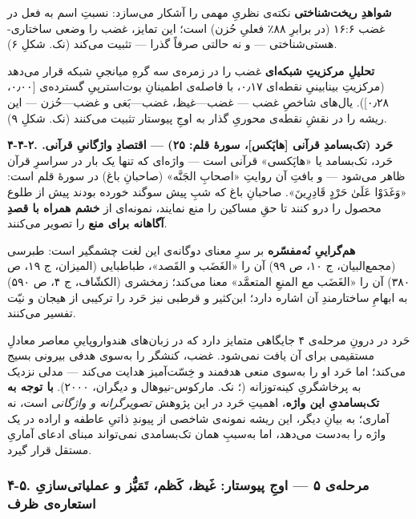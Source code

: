 \documentclass[12pt,a4paper]{article}
\begin{document}
\begin{RTL}
\begin{otherlanguage}{persian}
\textbf{شواهدِ ریخت‌شناختی} نکته‌ی نظریِ مهمی را آشکار می‌سازد: نسبتِ اسم به
فعل در غضب ۱۶:۶ (در برابرِ ۸۸٪ فعلیِ حُزن) است؛ این تمایز، غضب را وضعی
ساختاری-هستی‌شناختی --- و نه حالتی صرفاً گذرا --- تثبیت می‌کند (نک. شکلِ ۶).

\textbf{تحلیلِ مرکزیتِ شبکه‌ای} غضب را در زمره‌ی سه گرهِ میانجیِ شبکه قرار
می‌دهد (مرکزیتِ بینابینیِ نقطه‌ای ۰٫۱۷، با فاصله‌ی اطمینانِ بوت‌استرپیِ گسترده‌ی
{[}۰٫۰۰، ۰٫۲۸{]}). یال‌های شاخصِ غضب --- غضب---غیظ، غضب---بَغی و غضب---حُزن
--- این ریشه را در نقشِ نقطه‌ی محوریِ گذار به اوجِ پیوستار تثبیت می‌کنند (نک.
شکلِ ۹).

\textbf{۴-۴-۲. حَرد (تک‌بسامدِ قرآنی {[}هاپَکس{]}، سورۀ قلم: ۲۵) --- اقتصادِ
واژگانیِ قرآنی.} حَرد، تک‌بسامد یا «هاپَکسی» قرآنی است --- واژه‌ای که تنها یک
بار در سراسرِ قرآن ظاهر می‌شود --- و بافتِ آن روایتِ «اصحابِ الجَنَّه» (صاحبانِ
باغ) در سورۀ قلم است: «وَغَدَوْا عَلَىٰ حَرْدٍ قَادِرِينَ». صاحبانِ باغ که شبِ پیش سوگند
خورده بودند پیش از طلوع محصول را درو کنند تا حقِ مساکین را منع نمایند،
نمونه‌ای از \textbf{خشم همراه با قصدِ آگاهانه برای منع} را تصویر می‌کنند.

\textbf{هم‌گراییِ نُه‌مفسّره} بر سرِ معنای دوگانه‌ی این لغت چشمگیر است: طبرسی
(مجمع‌البیان، ج ۱۰، ص ۹۹) آن را «الغَضَب و القَصد»، طباطبایی (المیزان، ج ۱۹،
ص ۳۸۰) آن را «الغَضَب مع المنعِ المتعمَّد» معنا می‌کند؛ زمخشری (الکشّاف، ج ۴، ص
۵۹۰) به ابهامِ ساختارمندِ آن اشاره دارد؛ ابن‌کثیر و قرطبی نیز حَرد را ترکیبی
از هیجان و نیّت تفسیر می‌کنند.

حَرد در درونِ مرحله‌ی ۴ جایگاهی متمایز دارد که در زبان‌های هندواروپاییِ معاصر
معادلِ مستقیمی برای آن یافت نمی‌شود. غضب، کنشگر را به‌سوی هدفی بیرونی بسیج
می‌کند؛ اما حَرد او را به‌سوی منعی هدفمند و خِسّت‌آمیز هدایت می‌کند --- مدلی
نزدیک به پرخاشگریِ کینه‌توزانه (؛ نک.
مارکوس-نیوهال و دیگران، ۲۰۰۰). \textbf{با توجه به تک‌بسامدیِ این واژه}،
اهمیتِ حَرد در این پژوهش \emph{تصویرگرانه و واژگانی} است، نه آماری؛ به
بیانِ دیگر، این ریشه نمونه‌ی شاخصی از پیوندِ ذاتیِ عاطفه و اراده در یک واژه
را به‌دست می‌دهد، اما به‌سببِ همان تک‌بسامدی نمی‌تواند مبنای ادعای آماریِ مستقل
قرار گیرد.

\subsubsection{۴-۵. مرحله‌ی ۵ --- اوجِ پیوستار: غَیظ، کَظم، تَمَیُّز و
عملیاتی‌سازیِ استعاره‌ی
ظرف}\label{ux645ux631ux62dux644ux647ux6cc-ux6f5-ux627ux648ux62c-ux67eux6ccux648ux633ux62aux627ux631-ux63aux6ccux638-ux6a9ux638ux645-ux62aux645ux6ccux632-ux648-ux639ux645ux644ux6ccux627ux62aux6ccux633ux627ux632ux6cc-ux627ux633ux62aux639ux627ux631ux647ux6cc-ux638ux631ux641}


\end{otherlanguage}
\end{RTL}
\end{document}

